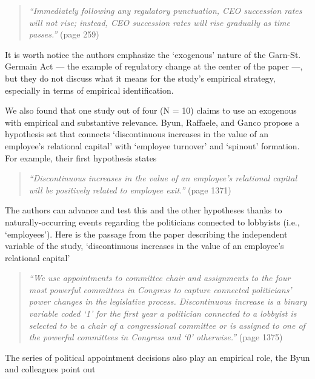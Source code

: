 \documentclass[11pt]{article}
\begin{document}
\begin{refsection}
\begin{quote}
  \textit{
    ``Immediately following any regulatory punctuation, CEO succession rates
    will not rise; instead, CEO succession rates will rise gradually as time
    passes.''
  }
  (page 259)
\end{quote}

It is worth notice the authors emphasize the `exogenous' nature of the Garn-St.
Germain Act --- the example of regulatory change at the center of the paper 
---, but they do not discuss what it means for the study's empirical strategy, 
especially in terms of empirical identification.

We also found that one study out of four (N = 10) claims to use an exogenous with
empirical and substantive relevance. Byun, Raffaele, and Ganco
\autocite{byun20191368} propose a hypothesis set that connects `discontinuous
increases in the value of an employee's relational capital' with `employee
turnover' and `spinout' formation. For example, their first hypothesis states

\begin{quote}
  \textit{
    ``Discontinuous increases in the value of an  employee's relational capital
    will be positively related to employee exit.''
  }
  (page 1371)
\end{quote}

The authors can advance and test this and the other hypotheses thanks to
naturally-occurring events regarding the politicians connected to lobbyists
(i.e., `employees').  Here is the passage from the paper describing the
independent variable of the study, `discontinuous increases in the value of an
employee's relational capital'

\begin{quote}
  \textit{
    ``We use appointments to committee chair and assignments to the four most
    powerful committees in Congress to capture connected politicians' power
    changes in the legislative process. Discontinuous increase is a binary
    variable coded `1' for the first year a politician connected to a lobbyist
    is selected to be a chair of a congressional committee or is assigned to one
    of the powerful committees in Congress and `0' otherwise.''
  }
  (page 1375)
\end{quote}

The series of political appointment decisions also play an empirical role, the 
Byun and colleagues point out


\end{refsection}
\end{document}
